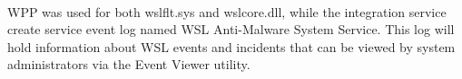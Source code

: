         \paragraph{}
        WPP was used for both wslflt.sys and wslcore.dll, while the integration service create service event log named WSL Anti-Malware System 
        Service. This log will hold information about WSL events and incidents that can be viewed by system administrators via the Event Viewer
        utility.